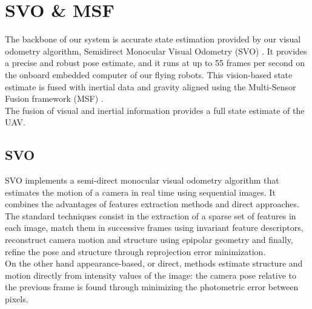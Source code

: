 \section{SVO \& MSF} \label{sec:state_estimation}
The backbone of our system is accurate state estimation provided by our visual odometry algorithm, Semidirect Monocular Visual Odometry (SVO) \cite{forster2014svo}. It provides a precise and robust pose estimate, and it runs at up to 55 frames per second on the onboard embedded computer of our flying robots. This vision-based state estimate is fused with inertial data and gravity aligned using the Multi-Sensor Fusion framework (MSF) \cite{lynen2013robust}.\\
The fusion of visual and inertial information provides a full state estimate of the UAV.\\


\subsection{SVO}

SVO implements a semi-direct monocular visual odometry algorithm that estimates the motion of a camera in real time using sequential images. It combines the advantages of features extraction methods and direct approaches.\\
The standard techniques consist in the extraction of a sparse set of features in each image, match them in successive frames using invariant feature descriptors, reconstruct camera motion and structure using epipolar geometry and finally, refine the pose and structure through reprojection error minimization. \\
On the other hand appearance-based, or direct, methods estimate structure and motion directly from intensity values of the image: the camera pose relative to the previous frame is found through minimizing the photometric error between pixels.\\


